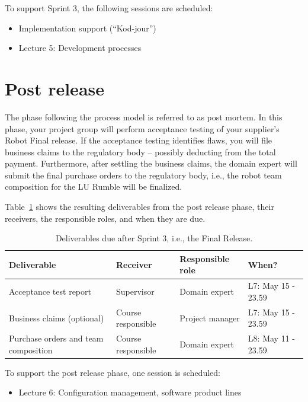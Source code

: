\documentclass{scrreprt}
\begin{document}
To support Sprint 3, the following sessions are scheduled:
\begin{itemize}
\item Implementation support (``Kod-jour'')
\item Lecture 5: Development processes
\end{itemize}

\section{Post release}
The phase following the process model is referred to as post mortem. In this phase, your project group will perform acceptance testing of your supplier's Robot Final release. If the acceptance testing identifies flaws, you will file business claims to the regulatory body -- possibly deducting from the total payment. Furthermore, after settling the business claims, the domain expert will submit the final purchase orders to the regulatory body, i.e., the robot team composition for the LU Rumble will be finalized.

Table~\ref{tab:postrelease} shows the resulting deliverables from the post release phase, their receivers, the responsible roles, and when they are due.

\begin{table}[]
\centering
\caption{Deliverables due after Sprint 3, i.e., the Final Release.}
\label{tab:postrelease}
\begin{tabular}{|p{4cm}|p{2cm}|p{2.5cm}|p{4.5cm}|}
\hline
\textbf{Deliverable}           & \textbf{Receiver}   & \textbf{Responsible role} & \textbf{When?}     \\ \hline
Acceptance test report   & Supervisor          & Domain expert           & L7: May 15 - 23.59 \\ \hline
Business claims (optional)                       & Course responsible & Project manager     & L7: May 15 - 23.59 \\ \hline
Purchase orders and team composition       & Course responsible & Domain expert         & L8: May 11 - 23.59  \\ \hline
\end{tabular}
\end{table}

To support the post release phase, one session is scheduled:
\begin{itemize}
\item Lecture 6: Configuration management, software product lines
\end{itemize}
\end{document}
